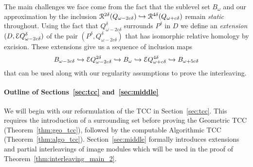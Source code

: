 The main challenges we face come from the fact that the sublevel set $B_\omega$ and our approximation by the inclusion $\mathcal{R}^{2\delta}(Q_{\omega-2c\delta})\hookrightarrow \mathcal{R}^{4\delta}(Q_{\omega+c\delta})$ remain \emph{static} throughout.
Using the fact that $Q_{\omega-2c\delta}^\delta$ surrounds $P^\delta$ in $D$ we define an \emph{extension} $(D,\mathcal{E} Q_{\omega-2c\delta}^\delta)$ of the pair $(P^\delta, Q_{\omega-2c\delta}^\delta)$ that has isomorphic relative homology by excision.
These extensions give us a sequence of inclusion maps
\[ B_{\omega-3c\delta}\hookrightarrow \mathcal{E} Q_{\omega-2c\delta}^{2\delta}\hookrightarrow B_\omega\hookrightarrow \mathcal{E} Q_{\omega+c\delta}^{4\delta}\hookrightarrow B_{\omega+5c\delta}\]
that can be used along with our regularity assumptions to prove the interleaving. %

\paragraph{Outline of Sections~\ref{sec:tcc} and~\ref{sec:middle}}

We will begin with our reformulation of the TCC in Section~\ref{sec:tcc}.
This requires the introduction of a surrounding set before proving the Geometric TCC (Theorem~\ref{thm:geo_tcc}), followed by the computable Algorithmic TCC  (Theorem~\ref{thm:algo_tcc}).
Section~\ref{sec:middle} formally introduces extensions and partial interleavings of image modules which will be used in the proof of Theorem~\ref{thm:interleaving_main_2}.

%

